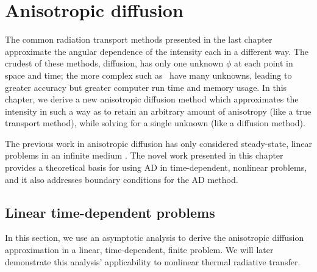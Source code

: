 
\chapter{Anisotropic diffusion}\label{chap:adDerivation}

\newcommand{\Iv}{I_\mathrm{v}}
\newcommand{\Ibl}{I_\mathrm{bl}}
\newcommand{\Iil}{I_\mathrm{il}}

The common radiation transport methods presented
in the last chapter approximate the angular dependence of the intensity each
in a different way. The crudest of these methods, diffusion, has only one
unknown
$\phi$ at each point in space and time; the more complex such as \SN\ have many
unknowns, leading to greater accuracy but greater computer run time and memory
usage. In this chapter, we derive a new anisotropic diffusion method which
approximates the intensity in such a way as to retain an arbitrary amount of
anisotropy (like a true transport method), while solving for a single unknown
(like a diffusion method).

The previous work in anisotropic diffusion has only considered steady-state,
linear problems in an infinite medium \cite{Lar2009c,Mor2007}. The novel work
presented in this chapter provides a
theoretical basis for using AD in time-dependent, nonlinear problems, and it
also addresses boundary conditions for the AD method.

\section{Linear time-dependent problems}\label{sec:adDerivation}

In this section, we use an asymptotic analysis to derive the anisotropic
diffusion approximation in a linear, time-dependent, finite problem. We will
later demonstrate this analysis' applicability to nonlinear thermal radiative
transfer.

